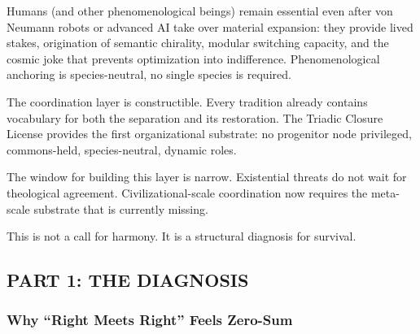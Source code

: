 \documentclass[
]{article}
\begin{document}
Humans (and other phenomenological beings) remain essential even after
von Neumann robots or advanced AI take over material expansion: they
provide lived stakes, origination of semantic chirality, modular
switching capacity, and the cosmic joke that prevents optimization into
indifference. Phenomenological anchoring is species-neutral, no single
species is required.

The coordination layer is constructible. Every tradition already
contains vocabulary for both the separation and its restoration. The
Triadic Closure License provides the first organizational substrate: no
progenitor node privileged, commons-held, species-neutral, dynamic
roles.

The window for building this layer is narrow. Existential threats do not
wait for theological agreement. Civilizational-scale coordination now
requires the meta-scale substrate that is currently missing.

This is not a call for harmony. It is a structural diagnosis for
survival.

\subsection{PART 1: THE DIAGNOSIS}\label{part-1-the-diagnosis}

\subsubsection{Why ``Right Meets Right'' Feels
Zero-Sum}\label{why-right-meets-right-feels-zero-sum}
\end{document}
